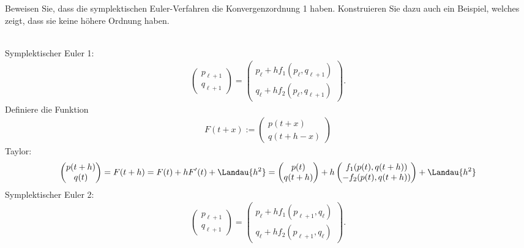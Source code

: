 \begin{exercise}
  Beweisen Sie, dass die symplektischen Euler-Verfahren die Konvergenzordnung 1
  haben. Konstruieren Sie dazu auch ein Beispiel, welches zeigt, dass sie keine
  höhere Ordnung haben.
\end{exercise}

\begin{solution}
\leavevmode \\
Symplektischer Euler 1:
\begin{align*}
  \begin{pmatrix}
    p_{\ell + 1} \\ q_{\ell + 1}
  \end{pmatrix}
  =
  \begin{pmatrix}
    p_{\ell} + hf_1(p_{\ell},q_{\ell + 1}) \\
    q_{\ell} + hf_2(p_{\ell},q_{\ell + 1})
  \end{pmatrix}.
\end{align*}
Definiere die Funktion
\begin{align*}
  F(t + x) := \begin{pmatrix}
    p(t+x) \\ q(t+h-x)
  \end{pmatrix}
\end{align*}
Taylor:
\begin{align*}
  \begin{pmatrix}
    p(t+h) \\ q(t)
  \end{pmatrix} =
  F(t+h) = F(t) + hF^{\prime}(t) + \Landau{h^2}
  = \begin{pmatrix}
    p(t) \\ q(t+h)
  \end{pmatrix}
  + h
  \begin{pmatrix}
    f_1(p(t),q(t+h)) \\ -f_2(p(t),q(t+h))
  \end{pmatrix}
  + \Landau{h^2}
\end{align*}
Symplektischer Euler 2:
\begin{align*}
  \begin{pmatrix}
    p_{\ell + 1} \\ q_{\ell + 1}
  \end{pmatrix}
  =
  \begin{pmatrix}
    p_{\ell} + hf_1(p_{\ell + 1},q_{\ell}) \\
    q_{\ell} + hf_2(p_{\ell + 1},q_{\ell})
  \end{pmatrix}.
\end{align*}

\end{solution}
